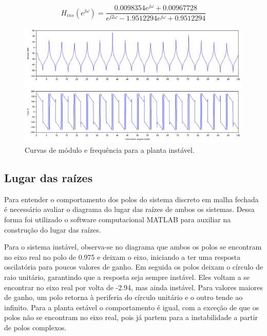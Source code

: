\begin{equation} \label{freqrep:ins}
    H_{ins}(e^{j \omega}) = \frac{0.0098354e^{j \omega}+0.00967728}{e^{j 2\omega} - 1.9512294e^{j \omega} + 0.9512294}
\end{equation}



\begin{figure}[H]
\begin{center}
\includegraphics[width=15cm]{images/freq/instavel_freq.png}
\caption{Curvas de módulo e frequência para a planta instável.}
\label{freq:ins} 
\end{center}
\end{figure}

\subsection{Lugar das raízes}

Para entender o comportamento dos polos do sistema discreto em malha fechada é necessário avaliar o diagrama do lugar das raízes de ambos os sistemas. Dessa forma foi utilizado o software computacional MATLAB para auxiliar na construção do lugar das raízes.

Para o sistema instável, observa-se no diagrama que ambos os polos se encontram no eixo real no polo de 0.975 e deixam o eixo, iniciando a ter uma resposta oscilatória para poucos valores de ganho. Em seguida os polos deixam o círculo de raio unitário, garantindo que a resposta seja sempre instável. Eles voltam a se encontrar no eixo real por volta de -2.94, mas ainda instável. Para valores maiores de ganho, um polo retorna à periferia do círculo unitário e o outro tende ao infinito. Para a planta estável o comportamento é igual, com a exceção de que os polos não se encontram no eixo real, pois já partem para a instabilidade a partir de polos complexos.

